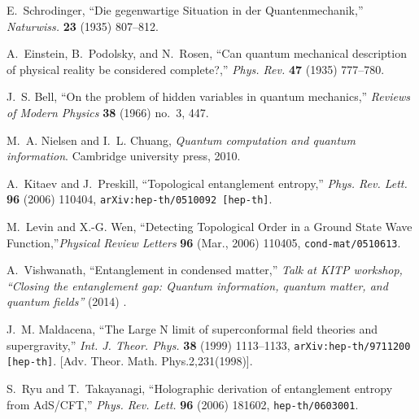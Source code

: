 \providecommand{\href}[2]{#2}\begingroup\raggedright\begin{thebibliography}{100}

E.~Schrodinger, ``{Die gegenwartige Situation in der Quantenmechanik},''
\href{http://dx.doi.org/10.1007/BF01491891}{{\em Naturwiss.} {\bf 23} (1935)
  807--812}.

A.~Einstein, B.~Podolsky, and N.~Rosen, ``{Can quantum mechanical description
  of physical reality be considered complete?},''
\href{http://dx.doi.org/10.1103/PhysRev.47.777}{{\em Phys. Rev.} {\bf 47}
  (1935)  777--780}.

J.~S. Bell, ``On the problem of hidden variables in quantum mechanics,'' {\em
  Reviews of Modern Physics} {\bf 38} (1966) no.~3, 447.

M.~A. Nielsen and I.~L. Chuang, {\em Quantum computation and quantum
  information}.
\newblock Cambridge university press, 2010.

A.~Kitaev and J.~Preskill, ``{Topological entanglement entropy},''
  \href{http://dx.doi.org/10.1103/PhysRevLett.96.110404}{{\em Phys. Rev. Lett.}
  {\bf 96} (2006)  110404},
\href{http://arxiv.org/abs/hep-th/0510092}{{\tt arXiv:hep-th/0510092
  [hep-th]}}.

M.~{Levin} and X.-G. {Wen},
  \href{http://dx.doi.org/10.1103/PhysRevLett.96.110405}{``{Detecting
  Topological Order in a Ground State Wave Function},''{\em Physical Review
  Letters} {\bf 96} (Mar., 2006)  110405},
  \href{http://arxiv.org/abs/cond-mat/0510613}{{\tt cond-mat/0510613}}.

A.~Vishwanath, ``{Entanglement in condensed matter},'' {\em Talk at KITP
  workshop, ``Closing the entanglement gap: Quantum information, quantum
  matter, and quantum fields''} (2014)  .

J.~M. Maldacena, ``{The Large N limit of superconformal field theories and
  supergravity},'' \href{http://dx.doi.org/10.1023/A:1026654312961}{{\em Int.
  J. Theor. Phys.} {\bf 38} (1999)  1113--1133},
  \href{http://arxiv.org/abs/hep-th/9711200}{{\tt arXiv:hep-th/9711200
  [hep-th]}}.
[Adv. Theor. Math. Phys.2,231(1998)].

S.~Ryu and T.~Takayanagi, ``{Holographic derivation of entanglement entropy
  from AdS/CFT},'' {\em Phys. Rev. Lett.} {\bf 96} (2006)  181602,
\href{http://arxiv.org/abs/hep-th/0603001}{{\tt hep-th/0603001}}.


\end{thebibliography}
